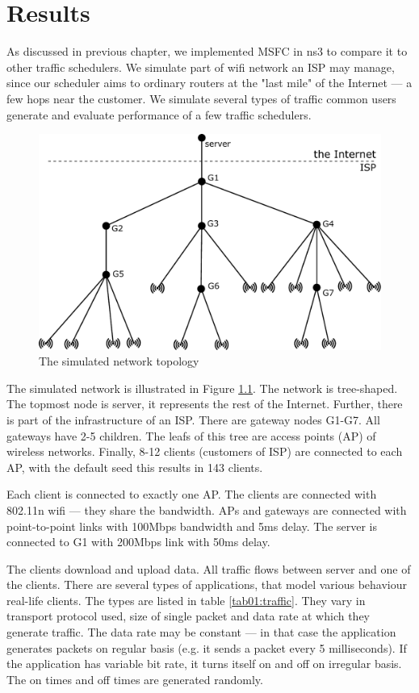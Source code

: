 \chapter{Results}
\label{chap:sidh}
As discussed in previous chapter, we implemented MSFC in ns3 to compare it to other traffic schedulers. We simulate part of wifi network an ISP may manage, since our scheduler aims to ordinary routers at the "last mile" of the Internet --- a few hops near the customer. We simulate several types of traffic common users generate and evaluate performance of a few traffic schedulers.

\begin{figure}
	\centering
	\includegraphics[width=137mm]{drawings/layout}
	\caption{The simulated network topology}
	\label{fig11:sim_layout}
\end{figure}


The simulated network is illustrated in Figure \ref{fig11:sim_layout}. The network is tree-shaped. The topmost node is server, it represents the rest of the Internet. Further, there is part of the infrastructure of an ISP. There are gateway nodes G1-G7. All gateways have 2-5 children. The leafs of this tree are access points (AP) of wireless networks. Finally, 8-12 clients (customers of ISP) are connected to each AP, with the default seed this results in 143 clients. 

Each client is connected to exactly one AP. The clients are connected with 802.11n wifi --- they share the bandwidth. APs and gateways are connected with point-to-point links with 100Mbps bandwidth and 5ms delay. The server is connected to G1 with 200Mbps link with 50ms delay.


The clients download and upload data. All traffic flows between server and one of the clients. There are several types of applications, that model various behaviour real-life clients. The types are listed in table \ref{tab01:traffic}. They vary in transport protocol used, size of single packet and data rate at which they generate traffic. The data rate may be constant --- in that case the application generates packets on regular basis (e.g. it sends a packet every 5 milliseconds). If the application has variable bit rate, it turns itself on and off on irregular basis. The on times and off times are generated randomly.

